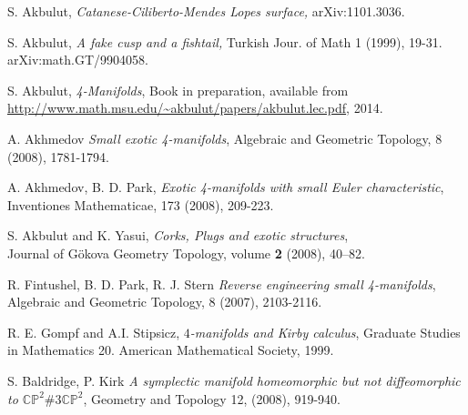\documentclass[11pt]{amsart}
\begin{document}
\begin{thebibliography}{9999}

 S. Akbulut, {\em Catanese-Ciliberto-Mendes Lopes surface,}
	arXiv:1101.3036.
	
	   S. Akbulut, {\em  A fake cusp and a fishtail,}   Turkish Jour. of Math 1 (1999), 19-31.   arXiv:math.GT/9904058.
	 
	 	    S. Akbulut, {\em 4-Manifolds}, Book in preparation, available from\\
  \url{http://www.math.msu.edu/~akbulut/papers/akbulut.lec.pdf}, 2014.

	 	 	 
	A. Akhmedov  {\em Small exotic 4-manifolds}, Algebraic and Geometric Topology, 8 (2008), 1781-1794.
	 
	   A. Akhmedov, B. D. Park, {\em Exotic 4-manifolds with small Euler characteristic}, Inventiones Mathematicae,
173 (2008), 209-223.

  S. Akbulut and K. Yasui, {\em Corks, Plugs and exotic structures}, \\Journal of G\"{o}kova Geometry Topology, volume \textbf{2} (2008), 40--82.  

	  
	 R. Fintushel, B. D. Park, R. J. Stern {\em Reverse engineering small 4-manifolds}, Algebraic and Geometric
Topology, 8 (2007), 2103-2116.

 R. E. Gompf and A.I. Stipsicz,  {\em $4$-manifolds and Kirby calculus}, Graduate Studies in Mathematics 20. American Mathematical Society, 1999.
	  
 S.  Baldridge, P. Kirk  {\em A symplectic manifold homeomorphic but not diffeomorphic to ${{{\mathbb C}}{{\mathbb P}}}^{2}\# 3 {{{\mathbb C}}{{\mathbb P}}}^{2}$}, Geometry
and Topology 12, (2008), 919-940.

\end{thebibliography}
\end{document}
